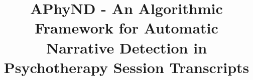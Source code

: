 \documentclass[preprint,12pt]{elsarticle}
\begin{document}
\begin{frontmatter}



\title{APhyND - An Algorithmic Framework for Automatic Narrative Detection in Psychotherapy Session Transcripts}



\end{frontmatter}
\end{document}
